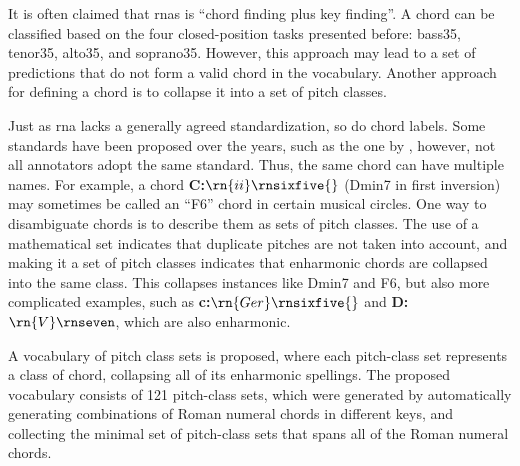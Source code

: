 
It is often claimed that \glspl{rna} is ``chord finding plus
key finding''. A chord can be classified based on the four
\gls{closed-position} tasks presented before: \gls{bass35},
\gls{tenor35}, \gls{alto35}, and \gls{soprano35}. However,
this approach may lead to a set of predictions that do not
form a valid chord in the vocabulary. Another approach for
defining a chord is to collapse it into a set of pitch
classes.

Just as \gls{rna} lacks a generally agreed standardization,
so do chord labels. Some standards have been proposed over
the years, such as the one by \textcite{harte2005automatic},
however, not all annotators adopt the same standard. Thus,
the same chord can have multiple names. For example, a chord
\textbf{C:}$\rn{ii}\rnsixfive{}$ (Dmin7 in first inversion) may
sometimes be called an ``F6'' chord in certain musical
circles. One way to disambiguate chords is to describe them
as sets of pitch classes. The use of a mathematical set
indicates that duplicate pitches are not taken into account,
and making it a set of pitch classes indicates that
enharmonic chords are collapsed into the same class. This
collapses instances like Dmin7 and F6, but also more
complicated examples, such as \textbf{c:}$\rn{Ger}\rnsixfive{}$ and
\textbf{D\musFlat{}:}$\rn{V}\rnseven$, which are also enharmonic.

A vocabulary of pitch class sets is proposed, where each
pitch-class set represents a class of chord, collapsing all
of its enharmonic spellings. The proposed vocabulary
consists of 121 pitch-class sets, which were generated by
automatically generating combinations of Roman numeral
chords in different keys, and collecting the minimal set of
pitch-class sets that spans all of the Roman numeral chords.



